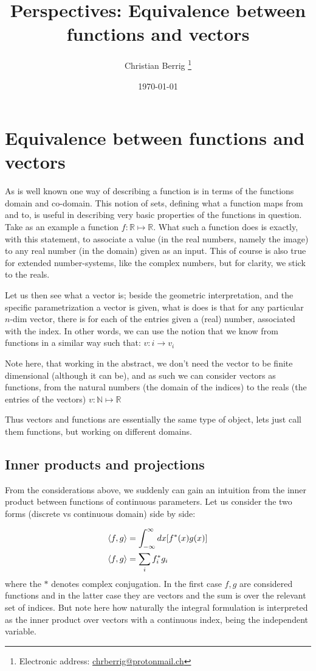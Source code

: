 \documentclass[a4paper,twoside]{article}
\title{Perspectives: Equivalence between functions and vectors}
\author[1]{Christian Berrig
\thanks{Electronic address: \href{mailto:chrberrig@protonmail.ch}{chrberrig@protonmail.ch}}
}
\affil[1]{Institute of Science and Environment, RUC}
\date{\today}
\newcommand{\innerp}[2]{\left\langle #1 , #2 \right\rangle}
\begin{document}
\maketitle


\section{Equivalence between functions and vectors}
As is well known one way of describing a function is in terms of the functions domain and co-domain. 
This notion of sets, defining what a function maps from and to, is useful in describing very basic properties of the functions in question. 
Take as an example a function 
$f: \mathbb{R} \mapsto \mathbb{R}$. 
What such a function does is exactly, with this statement, to associate a value (in the real numbers, namely the image) to any real number (in the domain) given as an input. 
This of course is also true for extended number-systems, like the complex numbers, but for clarity, we stick to the reals.

Let us then see what a vector is; 
beside the geometric interpretation, and the specific parametrization a vector is given, what is does is that for any particular $n$-dim vector, there is for each of the entries given a (real) number, associated with the index. 
In other words, we can use the notion that we know from functions in a similar way such that:
$v : i \rightarrow v_{i}$

Note here, that working in the abstract, we don't need the vector to be finite dimensional (although it can be), and as such we can consider vectors as functions, from the natural numbers (the domain of the indices) to the reals (the entries of the vectors)
$v: \mathbb{N} \mapsto \mathbb{R}$

Thus vectors and functions are essentially the same type of object, lets just call them functions, but working on different domains. 

\subsection{Inner products and projections}
From the considerations above, we suddenly can gain an intuition from the inner product between functions of continuous parameters. 
Let us consider the two forms (discrete vs continuous domain) side by side:

\begin{align*}
    \innerp{f}{g} &= \int_{-\infty}^{\infty} \dd x \qty[ f^{*}(x) g(x) ] \\
    \innerp{f}{g} &= \sum_{i} f_{i}^{*} g_{i}
\end{align*}
where the $*$ denotes complex conjugation. 
In the first case $f, g$ are considered functions and in the latter case they are vectors and the sum is over the relevant set of indices. 
But note here how naturally the integral formulation is interpreted as the inner product over vectors with a continuous index, being the independent variable. 
\end{document}

